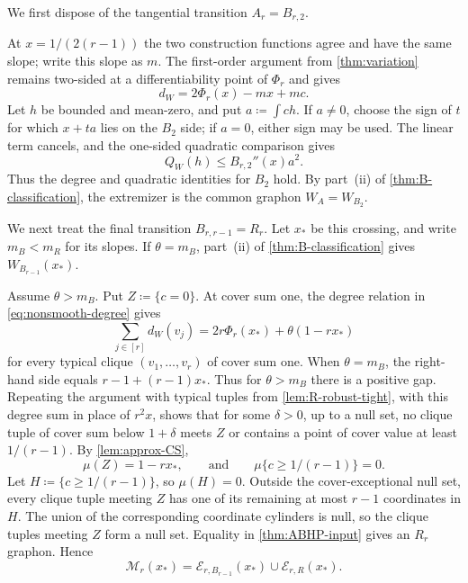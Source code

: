 \documentclass[10pt]{article}
\numberwithin{equation}{section}
\newcommand{\cE}{\mathcal E}
\newcommand{\cM}{\mathcal M}
\begin{document}
We first dispose of the tangential transition $A_r=B_{r,2}$.

At $x=1/(2(r-1))$ the two construction functions agree and have the same slope; write this slope as $m$.  The first-order argument from \cref{thm:variation} remains two-sided at a differentiability point of $\Phi_r$ and gives
\[
 d_W=2\Phi_r(x)-mx+mc.
\]
Let $h$ be bounded and mean-zero, and put $a\coloneqq\int ch$.  If $a\ne0$, choose the sign of $t$ for which $x+ta$ lies on the $B_2$ side; if $a=0$, either sign may be used.  The linear term cancels, and the one-sided quadratic comparison gives
\[
 Q_W(h)\le B_{r,2}''(x)a^2.
\]
Thus the degree and quadratic identities for $B_2$ hold.  By part~\textup{(ii)} of \cref{thm:B-classification}, the extremizer is the common graphon $W_A=W_{B_2}$.

We next treat the final transition $B_{r,r-1}=R_r$.  Let $x_*$ be this crossing, and write $m_B<m_R$ for its slopes.  If $\theta=m_B$, part~\textup{(ii)} of \cref{thm:B-classification} gives $W_{B_{r-1}}(x_*)$.

Assume $\theta>m_B$.  Put $Z\coloneqq\{c=0\}$.  At cover sum one, the degree relation in \cref{eq:nonsmooth-degree} gives
\[
 \sum_{j\in[r]}d_W(v_j)
 =2r\Phi_r(x_*)+\theta(1-rx_*)
\]
for every typical clique $(v_1,\ldots,v_r)$ of cover sum one.  When $\theta=m_B$, the right-hand side equals $r-1+(r-1)x_*$.  Thus for $\theta>m_B$ there is a positive gap.  Repeating the argument with typical tuples from \cref{lem:R-robust-tight}, with this degree sum in place of $r^2x$, shows that for some $\delta>0$, up to a null set, no clique tuple of cover sum below $1+\delta$ meets $Z$ or contains a point of cover value at least $1/(r-1)$.  By \cref{lem:approx-CS},
\[
 \mu(Z)=1-rx_*,
 \qquad\text{and}\qquad
 \mu\{c\ge1/(r-1)\}=0.
\]
Let $H\coloneqq\{c\ge1/(r-1)\}$, so $\mu(H)=0$.  Outside the cover-exceptional null set, every clique tuple meeting $Z$ has one of its remaining at most $r-1$ coordinates in $H$.  The union of the corresponding coordinate cylinders is null, so the clique tuples meeting $Z$ form a null set.  Equality in \cref{thm:ABHP-input} gives an $R_r$ graphon.  Hence
\begin{equation}\label{eq:BR-classification}
 \cM_r(x_*)=
 \cE_{r,B_{r-1}}(x_*)\cup\cE_{r,R}(x_*).
\end{equation}
\end{document}
